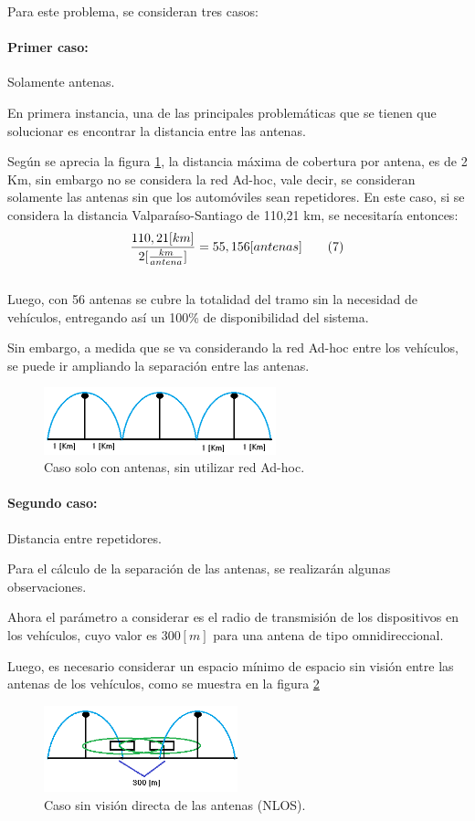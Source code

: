 \documentclass[12pt]{article}
\begin{document}
Para este problema, se consideran tres casos:
\paragraph{Primer caso:} Solamente antenas.

En primera instancia, una de las principales problemáticas que se tienen que solucionar es encontrar la 
distancia entre las antenas. 

Según se aprecia la figura \ref{fig:s-adhoc}, la distancia máxima de cobertura por antena, es de 2 Km, sin embargo no 
se considera la red Ad-hoc, vale decir, se consideran solamente las antenas sin que los automóviles sean 
repetidores. En este caso, si se considera la distancia Valparaíso-Santiago de 110,21 km, se necesitaría 
entonces:
\large $$ \frac{110,21 [km]}{2 [\frac{km}{antena}]}= 55,156 [antenas] \qquad \tiny(7)$$ \normalsize \\

Luego, con 56 antenas se cubre la totalidad del tramo sin la necesidad de vehículos, entregando así un 
100\% de disponibilidad del sistema.

Sin embargo, a medida que se va considerando la red Ad-hoc entre los vehículos, se puede ir  ampliando 
la separación entre las antenas.  

\begin{figure}[H]
  \centering
      \includegraphics[width=0.6\textwidth]{s-adhoc}
	    \caption{Caso solo con antenas, sin utilizar red Ad-hoc.}
	\label{fig:s-adhoc}
\end{figure}
\paragraph{Segundo caso:} Distancia entre repetidores.

Para el cálculo de la separación de las antenas, se realizarán algunas observaciones.

Ahora el parámetro a considerar es el radio de transmisión de los dispositivos en los vehículos, cuyo 
valor es $300[m]$ para una antena de tipo omnidireccional.

Luego, es necesario considerar un espacio mínimo de espacio sin visión entre las antenas de los vehículos, 
como se muestra en la figura \ref{fig:adhoc1}
\begin{figure}[H]
  \centering
      \includegraphics[width=0.5\textwidth]{adhoc1}
	    \caption{Caso sin visión directa de las antenas (NLOS).}
	\label{fig:adhoc1}
\end{figure}
\end{document}
